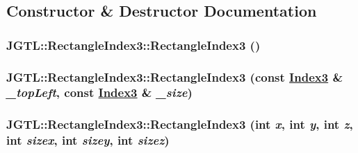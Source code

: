 \subsection{Constructor \& Destructor Documentation}
\hypertarget{class_j_g_t_l_1_1_rectangle_index3_c93fa463cd6badcc6cb1d8b16134fa32}{
\subsubsection[RectangleIndex3]{\setlength{\rightskip}{0pt plus 5cm}JGTL::Rectangle\-Index3::Rectangle\-Index3 ()}}
\label{class_j_g_t_l_1_1_rectangle_index3_c93fa463cd6badcc6cb1d8b16134fa32}


\hypertarget{class_j_g_t_l_1_1_rectangle_index3_f1661df1eeb1281cbcb639bbd6b3b583}{
\subsubsection[RectangleIndex3]{\setlength{\rightskip}{0pt plus 5cm}JGTL::Rectangle\-Index3::Rectangle\-Index3 (const \hyperlink{class_j_g_t_l_1_1_index3}{Index3} \& {\em \_\-top\-Left}, const \hyperlink{class_j_g_t_l_1_1_index3}{Index3} \& {\em \_\-size})}}
\label{class_j_g_t_l_1_1_rectangle_index3_f1661df1eeb1281cbcb639bbd6b3b583}


\hypertarget{class_j_g_t_l_1_1_rectangle_index3_71b5f48e90fdf1e3655a706b86555f5b}{
\subsubsection[RectangleIndex3]{\setlength{\rightskip}{0pt plus 5cm}JGTL::Rectangle\-Index3::Rectangle\-Index3 (int {\em x}, int {\em y}, int {\em z}, int {\em sizex}, int {\em sizey}, int {\em sizez})}}
\label{class_j_g_t_l_1_1_rectangle_index3_71b5f48e90fdf1e3655a706b86555f5b}




